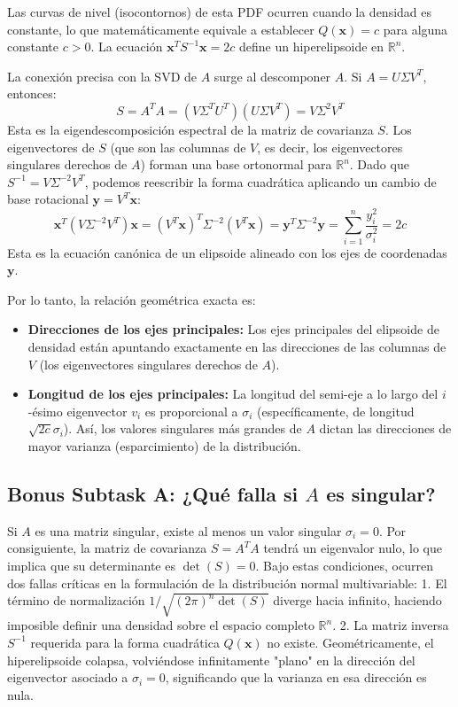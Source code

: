 \documentclass[12pt]{article}
\begin{document}
Las curvas de nivel (isocontornos) de esta PDF ocurren cuando la densidad es constante, lo que matemáticamente equivale a establecer $Q(\mathbf{x}) = c$ para alguna constante $c > 0$. La ecuación $\mathbf{x}^T S^{-1} \mathbf{x} = 2c$ define un hiperelipsoide en $\mathbb{R}^n$.

La conexión precisa con la SVD de $A$ surge al descomponer $A$. Si $A = U \Sigma V^T$, entonces:
\begin{equation}
    S = A^T A = (V \Sigma^T U^T)(U \Sigma V^T) = V \Sigma^2 V^T
\end{equation}
Esta es la eigendescomposición espectral de la matriz de covarianza $S$. Los eigenvectores de $S$ (que son las columnas de $V$, es decir, los eigenvectores singulares derechos de $A$) forman una base ortonormal para $\mathbb{R}^n$. 
Dado que $S^{-1} = V \Sigma^{-2} V^T$, podemos reescribir la forma cuadrática aplicando un cambio de base rotacional $\mathbf{y} = V^T \mathbf{x}$:
\begin{equation}
    \mathbf{x}^T (V \Sigma^{-2} V^T) \mathbf{x} = (V^T \mathbf{x})^T \Sigma^{-2} (V^T \mathbf{x}) = \mathbf{y}^T \Sigma^{-2} \mathbf{y} = \sum_{i=1}^{n} \frac{y_i^2}{\sigma_i^2} = 2c
\end{equation}
Esta es la ecuación canónica de un elipsoide alineado con los ejes de coordenadas $\mathbf{y}$. 

Por lo tanto, la relación geométrica exacta es:
\begin{itemize}
    \item \textbf{Direcciones de los ejes principales:} Los ejes principales del elipsoide de densidad están apuntando exactamente en las direcciones de las columnas de $V$ (los eigenvectores singulares derechos de $A$).
    \item \textbf{Longitud de los ejes principales:} La longitud del semi-eje a lo largo del $i$-ésimo eigenvector $v_i$ es proporcional a $\sigma_i$ (específicamente, de longitud $\sqrt{2c}\sigma_i$). Así, los valores singulares más grandes de $A$ dictan las direcciones de mayor varianza (esparcimiento) de la distribución.
\end{itemize}

\subsection*{Bonus Subtask A: ¿Qué falla si $A$ es singular?}
Si $A$ es una matriz singular, existe al menos un valor singular $\sigma_i = 0$. Por consiguiente, la matriz de covarianza $S = A^T A$ tendrá un eigenvalor nulo, lo que implica que su determinante es $\det(S) = 0$.
Bajo estas condiciones, ocurren dos fallas críticas en la formulación de la distribución normal multivariable:
1. El término de normalización $1 / \sqrt{(2\pi)^n \det(S)}$ diverge hacia infinito, haciendo imposible definir una densidad sobre el espacio completo $\mathbb{R}^n$.
2. La matriz inversa $S^{-1}$ requerida para la forma cuadrática $Q(\mathbf{x})$ no existe. Geométricamente, el hiperelipsoide colapsa, volviéndose infinitamente "plano" en la dirección del eigenvector asociado a $\sigma_i = 0$, significando que la varianza en esa dirección es nula.
\end{document}
